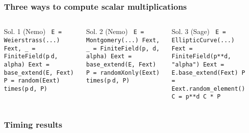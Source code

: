 \documentclass[12pt]{beamer}
\newcommand{\n}{\newline}
\begin{document}
\begin{frame}
\frametitle{Three ways to compute scalar multiplications}

\begin{columns}[t]
 \begin{block}{Sol. 1 (Nemo)}
  \scriptsize\tt
  E = Weierstrass(...)\n
  Fext, \_ = FiniteField(p$\hat{~}$d, alpha)\n
  Eext = base\_extend(E, Fext)\n
  P = random(Eext)\n
  times(p$\hat{~}$d, P)
 \end{block}

 \begin{block}{Sol. 2 (Nemo)}
  \scriptsize\tt
  E = Montgomery(...)\n
  Fext, \_ = FiniteField(p, d, alpha)\n
  Eext = base\_extend(E, Fext)\n
  P = randomXonly(Eext)\n
  times(p$\hat{~}$d, P)
 \end{block}


 \begin{block}{Sol. 3 (Sage)}
  \scriptsize\tt
  E = EllipticCurve(...)\n
  Fext = FiniteField(p**d, "alpha")\n
  Eext = E.base\_extend(Fext)\n
  P = Eext.random\_element()\n
  C = p**d\n
  C * P
 \end{block}
\end{columns}

\end{frame}


\begin{frame}
 \frametitle{Timing results}
 \vspace{-1cm}
 \begin{center}
 \end{center}
\end{frame}
\end{document}
